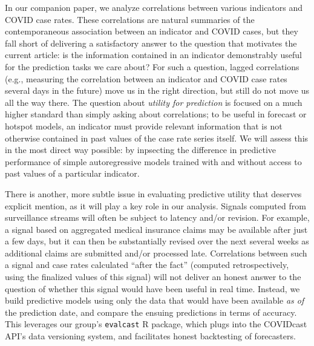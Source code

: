 \documentclass[9pt,twocolumn,twoside,lineno]{pnas-new}
\begin{document}
In our companion paper, we analyze correlations between various indicators and   
COVID case rates. These correlations are natural summaries of the
contemporaneous association between an indicator and COVID cases, but they fall
short of delivering a satisfactory answer to the question that motivates the
current article: is the information contained in an indicator demonstrably
useful for the prediction tasks we care about? For such a question, lagged
correlations (e.g., measuring the correlation between an indicator and COVID
case rates several days in the future) move us in the right direction, but still
do not move us all the way there. The question about \emph{utility for
  prediction} is focused on a much higher standard than simply asking 
about correlations; to be useful in forecast or hotspot models, an indicator
must provide relevant information that is not otherwise contained in past values
of the case rate series itself. We will assess this in the most direct way
possible: by inpsecting the difference in predictive performance of simple
autoregressive models trained with and without access to past values of a
particular indicator.   

There is another, more subtle issue in evaluating predictive utility that 
deserves explicit mention, as it will play a key role in our analysis.
Signals computed from surveillance streams will often be subject to  
latency and/or revision. For example, a signal based on aggregated medical
insurance claims may be available after just a few days, but it can then be
substantially revised over the next several weeks as additional claims are
submitted and/or processed late. Correlations between such a signal and case
rates calculated ``after the fact'' (computed retrospectively, using the
finalized values of this signal) will not deliver an honest answer to the    
question of whether this signal would have been useful in real time. Instead,
we build predictive models using only the data that would have been available
\emph{as of} the prediction date, and compare the ensuing predictions in terms
of accuracy. This leverages our group's {\tt evalcast} R package, which plugs
into the COVIDcast API's data versioning system, and facilitates honest
backtesting of forecasters.
\end{document}
